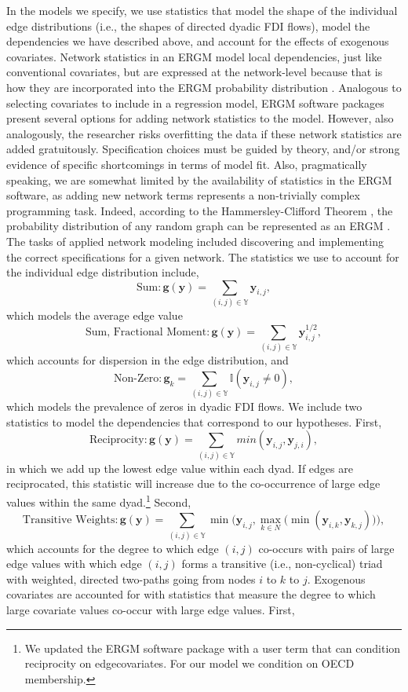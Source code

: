 \documentclass[reqno,onecolumn,letterpaper,12pt]{article}
\begin{document}
In the models we specify, we use statistics that model the shape of the individual edge distributions (i.e., the shapes of directed dyadic FDI flows), model the dependencies we have described above, and account for the effects of exogenous covariates. Network statistics in an ERGM model local dependencies, just like conventional covariates, but are expressed at the network-level because that is how they are incorporated into the ERGM probability distribution \citep{desmarais2012micro}. Analogous to selecting covariates to include in a regression model, ERGM software packages present several options for adding network statistics to the model. However, also analogously, the researcher risks overfitting the data if these network statistics are added gratuitously. Specification choices must be guided by theory, and/or strong evidence of specific shortcomings in terms of model fit.  Also, pragmatically speaking, we are somewhat limited by the availability of statistics in the ERGM software, as adding new network terms represents a non-trivially complex programming task.  Indeed, according to the Hammersley-Clifford Theorem \citep{hammersley1971markov}, the probability distribution of any random graph can be represented as an ERGM \citep{yang2014estimation}. The tasks of applied network modeling included discovering and implementing the correct specifications for a given network. The statistics we use to account for the individual edge distribution include, $$\text{Sum}:\bm{g(y)} = \sum_{(i,j) {\in} \mathbb{Y}}\bm{y}_{i,j},$$ which models the average edge value $$\text{Sum, Fractional Moment}:\bm{g(y)} = \sum_{(i,j) {\in} \mathbb{Y}}\bm{y}_{i,j}^{1/2},$$ which accounts for dispersion in the edge distribution, and
$$\text{Non-Zero}: \bm{g}_k = \sum_{(i,j) {\in} \mathbb{Y}} \mathbb{I}(\bm{y}_{i,j} \neq 0),$$ which models the prevalence of zeros in dyadic FDI flows. We include two statistics to model the dependencies that correspond to our hypotheses. First,
$$ \text{Reciprocity}: \bm{g(y)} = \sum_{(i,j) {\in} \mathbb{Y}}min(\bm{y}_{i,j},\bm{y}_{j,i}),$$ in which we add up the lowest edge value within each dyad. If edges are reciprocated, this statistic will increase due to the co-occurrence of large edge values within the same dyad.\footnote{We updated the ERGM software package with a user term that can condition reciprocity on edgecovariates. For our model we condition on OECD membership.} Second,
$$\text{Transitive Weights}: \bm{g(y)} =  \sum_{(i,j) {\in} \mathbb{Y}}\min\bigg( \bm{y}_{i,j}, \max\limits_{k{\in}N}\Big(\min(\bm{y}_{i,k},\bm{y}_{k,j})\Big) \bigg),$$ which accounts for the degree to which edge $(i,j)$ co-occurs with pairs of large edge values with which edge $(i,j)$ forms a transitive (i.e., non-cyclical) triad with weighted, directed two-paths going from nodes $i$ to $k$ to $j$. Exogenous covariates are accounted for with statistics that measure the degree to which large covariate values co-occur with large edge values. First,
\end{document}
